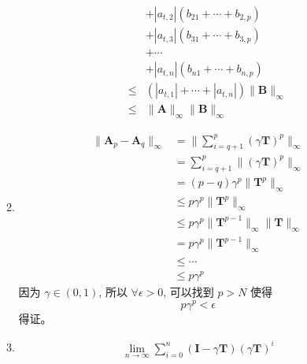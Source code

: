 \documentclass[11pt,letter,notitlepage]{article}
\begin{document}
\begin{solution}
\begin{enumerate}
\begin{enumerate}
\begin{enumerate}
$$\begin{aligned}
						                       & +|a_{t,2}| (b_{21}+\cdots+b_{2,p})                                                                     \\
						                       & +|a_{t,3}| (b_{31}+\cdots+b_{3,p})                                                                     \\
						                       & +\cdots                                                                                                \\
						                       & +   |a_{t,n}| (b_{n1}+\cdots+b_{n,p})                                                                  \\
						                  \leq & (|a_{t,1}|+\cdots+|a_{t,n}|)\|\mathbf{B}\|_\infty                                                      \\
						                  \leq & \|\mathbf{A}\|_\infty\|\mathbf{B}\|_\infty
					                  \end{aligned}$$
			            \end{enumerate}
			      \item $$\begin{aligned}
					            \|\mathbf{A}_p-\mathbf{A}_q\|_\infty
					             & =\|\sum_{i=q+1}^p (\gamma\mathbf{T})^p\|_\infty                  \\
					             & =\sum_{i=q+1}^p \|(\gamma\mathbf{T})^p\|_\infty                  \\
					             & = (p-q) \gamma^p \|\mathbf{T}^p\|_\infty                         \\
					             & \leq p\gamma^p \|\mathbf{T}^p\|_\infty                           \\
					             & \leq p\gamma^p \|\mathbf{T}^{p-1}\|_\infty \|\mathbf{T}\|_\infty \\
					             & =p\gamma^p \|\mathbf{T}^{p-1}\|_\infty                           \\
					             & \leq \cdots                                                      \\
					             & \leq p\gamma^p
				            \end{aligned}$$
			            因为 $\gamma\in(0,1)$, 所以 $\forall \epsilon >0$, 可以找到 $p>N$ 使得
			            $$p\gamma^p<\epsilon$$
			            得证。
			      \item $$\begin{aligned}
					            \lim_{n\rightarrow\infty}\sum_{i=0}^{n}(\mathbf{I}-\gamma \mathbf{T})(\gamma \mathbf{T})^i

\end{aligned}$$
\end{enumerate}
\end{enumerate}
\end{solution}
\end{document}
